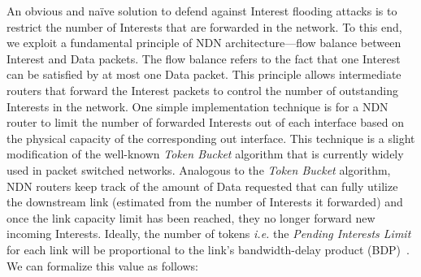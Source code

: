 




An obvious and na\"ive solution to defend against Interest flooding attacks is to restrict the number of Interests that are forwarded in the network. To this end, we exploit a 
 fundamental principle of NDN architecture---flow balance between Interest and Data packets. The flow balance refers to the fact that one Interest can be satisfied by at most one Data packet. This principle allows intermediate routers that forward the Interest packets to control the number of outstanding Interests in the network. 
One simple implementation technique  is for a NDN router to limit the number of forwarded Interests out of each interface based on the physical capacity of the corresponding out interface. This technique is a slight modification of the well-known {\it Token Bucket} algorithm that is currently widely used in packet switched networks. Analogous to the {\it Token Bucket} algorithm, NDN routers keep track of the amount of Data requested that can fully utilize the downstream link (estimated from the number of Interests it forwarded) and once the link capacity limit has been reached, they no longer forward new incoming Interests. Ideally, the number of tokens {\it i.e.} the \emph{Pending Interests Limit} for each link will be proportional to the link's bandwidth-delay product (BDP)~\cite{tcp-survey}. We can formalize this value as follows:

